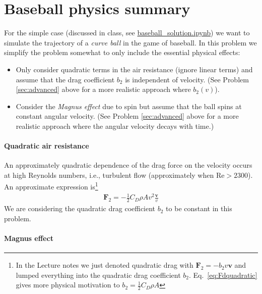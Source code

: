 \documentclass[letterpaper]{scrartcl}
\renewcommand{\vec}[1]{\ensuremath{\mathbf{#1}}}
\begin{document}
\appendix

\section{Baseball physics summary}
\label{sec:curveball}

For the simple case (discussed in class, see
\href{https://github.com/ASU-CompMethodsPhysics-PHY494/PHY494-resources/blob/master/12_ODE_applications/baseball_solution.ipynb}{baseball\_solution.ipynb})
we want to simulate the trajectory of a \emph{curve ball} in the game
of baseball. In this problem we simplify the problem somewhat to only
include the essential physical effects:
\begin{itemize}
\item Only consider quadratic terms in the air resistance (ignore
  linear terms) and assume that the drag coefficient $b_{2}$ is
  independent of velocity. (See Problem \ref{sec:advanced} above for a
  more realistic approach where $b_{2}(v)$).
\item Consider the \emph{Magnus effect} due to spin but assume that
  the ball spins at constant angular velocity. (See Problem
  \ref{sec:advanced} above for a more realistic approach where the
  angular velocity decays with time.)
\end{itemize}

\paragraph{Quadratic air resistance}

An approximately quadratic dependence of the drag force on the
velocity occurs at high Reynolds numbers, i.e., turbulent flow
(approximately when $\text{Re} > 2300$). An approximate expression
is\footnote{In the Lecture notes we just denoted quadratic drag with
  $\vec{F}_{2} = -b_2 v \vec{v}$ and lumped everything into the
  quadratic drag coefficient $b_{2}$. Eq.~\ref{eq:Fdquadratic} gives
  more physical motivation to $b_{2} = \frac{1}{2} C_{D} \rho A$}
\begin{gather}
\label{eq:Fdquadratic}
  \vec{F}_2 = -\frac{1}{2} C_{D} \rho A v^{2} \frac{\vec{v}}{v}
\end{gather}
We are considering the quadratic drag coefficient $b_{2}$ to be
constant in this problem.

\paragraph{Magnus effect}
\end{document}
